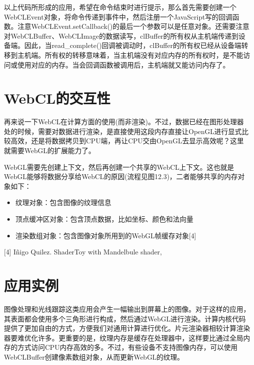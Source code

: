 以上代码所形成的应用，希望在命令结束时进行提示，那么首先需要创建一个WebCLEvent对象，将命令传递到事件中，然后注册一个JavaScript写的回调函数。注意WebCLEvent.setCallback()的最后一个参数可以是任意对象。还需要注意对WebCLBuffer、WebCLImage的数据读写，clBuffer的所有权从主机端传递到设备端。因此，当read\_\allowbreak{}complete()回调被调动时，clBuffer的所有权已经从设备端转移到主机端。所有权的转移意味着，当主机端没有对应内存的所有权时，是不能访问或使用对应的内存。当会回调函数被调用后，主机端就又能访问内存了。



\section{WebCL的交互性}

再来说一下WebCL在计算方面的使用(而非渲染)。不过，数据已经在图形处理器处的时候，需要对数据进行渲染，是直接使用这段内存直接让OpenGL进行显式比较高效，还是将数据拷贝到CPU端，再让CPU交由OpenGL去显示高效呢？这里就需要WebGL的扩展能力了。

WebGL需要先创建上下文，然后再创建一个共享的WebCL上下文。这也就是WebGL能够将数据分享给WebCL的原因(流程见图12.3)，二者能够共享的内存对象如下：

\begin{itemize}
\item 纹理对象：包含图像的纹理信息
\item 顶点缓冲区对象：包含顶点数据，比如坐标、颜色和法向量
\item 渲染数组对象：包含图像对象所用到的WebGL帧缓存对象[4]
\end{itemize}


\myRefRule

\begin{myRefs}

[4] Iñigo Quilez. ShaderToy with Mandelbule shader, 

\end{myRefs}



\section{应用实例}

图像处理和光线跟踪这类应用会产生一幅输出到屏幕上的图像。对于这样的应用，其表面都会使用多个三角形进行构成，然后通过WebGL进行渲染。计算内核代码提供了更加自由的方式，方便我们对通用计算进行优化。片元渲染器相较计算渲染器要难优化许多。更重要的是，纹理内存是缓存在处理器中，这样要比通过全局内存的方式访问CPU内存高效的多。不过，有些设备不支持图像内存，可以使用WebCLBuffer创建像素数组对象，从而更新WebGL的纹理。

